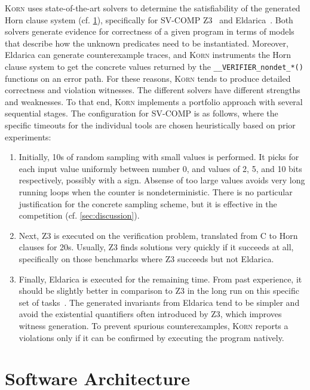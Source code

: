 \documentclass{llncs}
\newcommand{\Korn}{\textsc{Korn}\xspace}
\begin{document}
\Korn uses state-of-the-art solvers to determine the satisfiability of the generated Horn clause system (cf. \cref{sec:architecture}),
specifically for SV-COMP Z3~\cite{bjorner2013solving} and Eldarica~\cite{hojjat2018eldarica}.
Both solvers generate evidence for correctness of a given program in terms of models that describe how the unknown predicates need to be instantiated.
Moreover, Eldarica can generate counterexample traces, and \Korn instruments the Horn clause system to get
the concrete values returned by the \texttt{\_\_VERIFIER\_nondet\_*()} functions on an error path.
For these reasons, \Korn tends to produce detailed correctness and violation witnesses.
%
The different solvers have different strengths and weaknesses.
To that end, \Korn implements a portfolio approach with several sequential stages.
The configuration for SV-COMP is as follows,
where the specific timeouts for the individual tools are chosen heuristically based
on prior experiments:
\begin{enumerate}
    \item Initially, 10s of random sampling with small values is performed.
          It picks for each input value uniformly between number 0, and values of 2, 5, and 10 bits respectively, possibly with a sign.
          Absense of too large values avoids very long running loops
          when the counter is nondeterministic.
          There is no particular justification for the concrete sampling scheme,
          but it is effective in the competition (cf. \cref{sec:discussion}).
    \item Next, Z3 is executed on the verification problem, translated from C to Horn clauses for 20s. Usually, Z3 finds solutions very quickly if it succeeds at all,
          specifically on those benchmarks where Z3 succeeds but not Eldarica.
    \item Finally, Eldarica is executed for the remaining time.
          From past experience, it should be slightly better in comparison to Z3 in the long run on this specific set of tasks~\cite{ernst:arxiv2020:summaries}.
    The generated invariants from Eldarica tend to be simpler and avoid the existential quantifiers
    often introduced by Z3, which improves witness generation.
    To prevent spurious counterexamples,
    \Korn reports a violations only if it can be confirmed by executing the program natively.
\end{enumerate}

\section{Software Architecture}
\label{sec:architecture}
\end{document}
